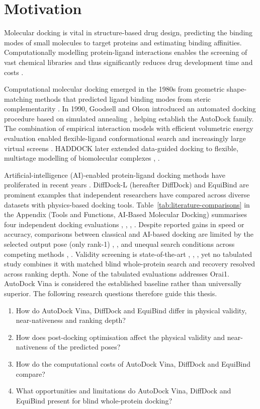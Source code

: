 \hypertarget{motivation}{%
\chapter{\texorpdfstring{Motivation }{Motivation }}\label{motivation}}

Molecular docking is vital in structure-based drug design, predicting the binding modes of small molecules to target proteins and estimating binding affinities. Computationally modelling protein-ligand interactions enables the screening of vast chemical libraries and thus significantly reduces drug development time and costs \cite{ref007}.

Computational molecular docking emerged in the 1980s from geometric shape-matching methods that predicted ligand binding modes from steric complementarity \cite{ref001}. In 1990, Goodsell and Olson introduced an automated docking procedure based on simulated annealing \cite{ref002}, helping establish the AutoDock family. The combination of empirical interaction models with efficient volumetric energy evaluation enabled flexible-ligand conformational search and increasingly large virtual screens \cite{ref003}. HADDOCK later extended data-guided docking to flexible, multistage modelling of biomolecular complexes \cite{ref004}, \cite{ref005}.

Artificial-intelligence (AI)-enabled protein-ligand docking methods have proliferated in recent years \cite{ref006}. DiffDock-L (hereafter DiffDock) and EquiBind are prominent examples that independent researchers have compared across diverse datasets with physics-based docking tools. Table~\ref{tab:literature-comparisons} in the Appendix (Tools and Functions, AI-Based Molecular Docking) summarises four independent docking evaluations \cite{ref012}, \cite{ref013}, \cite{ref032}, \cite{ref033}. Despite reported gains in speed or accuracy, comparisons between classical and AI-based docking are limited by the selected output pose (only rank-1) \cite{ref012}, \cite{ref013}, \cite{ref035} and unequal search conditions across competing methods \cite{ref011}, \cite{ref035}. Validity screening is state-of-the-art \cite{ref012}, \cite{ref013}, \cite{ref032}, yet no tabulated study combines it with matched blind whole-protein search and recovery resolved across ranking depth. None of the tabulated evaluations addresses Orai1. AutoDock Vina is considered the established baseline rather than universally superior. The following research questions therefore guide this thesis.

\begin{enumerate}
\item[\textbf{RQ1}] How do AutoDock Vina, DiffDock and EquiBind differ in physical validity, near-nativeness and ranking depth?
\item[\textbf{RQ2}] How does post-docking optimisation affect the physical validity and near-nativeness of the predicted poses?
\item[\textbf{RQ3}] How do the computational costs of AutoDock Vina, DiffDock and EquiBind compare?
\item[\textbf{RQ4}] What opportunities and limitations do AutoDock Vina, DiffDock and EquiBind present for blind whole-protein docking?
\end{enumerate}


